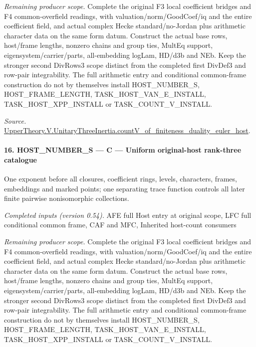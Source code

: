 \emph{Remaining producer scope.} Complete the original F3 local coefficient bridges and F4 common-overfield readings, with valuation/norm/GoodCoef/iq and the entire coefficient field, and actual complex Hecke standard/no-Jordan plus arithmetic character data on the same form datum. Construct the actual base rows, host/frame lengths, nonzero chains and group ties, MultEq support, eigensystem/carrier/parts, all-embedding logLam, HD/d3b and NEb. Keep the stronger second DivRows3 scope distinct from the completed first DivDef3 and row-pair integrability. The full arithmetic entry and conditional common-frame construction do not by themselves install HOST\_\allowbreak NUMBER\_\allowbreak S, HOST\_\allowbreak FRAME\_\allowbreak LENGTH, TASK\_\allowbreak HOST\_\allowbreak VAN\_\allowbreak E\_\allowbreak INSTALL, TASK\_\allowbreak HOST\_\allowbreak XPP\_\allowbreak INSTALL or TASK\_\allowbreak COUNT\_\allowbreak V\_\allowbreak INSTALL.

\emph{Source.} \href{https://github.com/CocoSgt/riemann-hypothesis-lean/blob/7cbf7a0c32fca1badf05931879a37c3f8a2b03b4/src/Development/AutomorphicArithmetic/AutomorphicVarieties/ModularityArgument/ThresholdArguments/DenseThresholdCases/CountVOf.lean#L33-L60}{UpperTheory.V.UnitaryThreeInertia.countV\_\allowbreak of\_\allowbreak finiteness\_\allowbreak duality\_\allowbreak euler\_\allowbreak host}.



\paragraph{16. HOST\_\allowbreak NUMBER\_\allowbreak S — C — Uniform original-host rank-three catalogue}

One exponent before all closures, coefficient rings, levels, characters, frames, embeddings and marked points; one separating trace function controls all later finite pairwise nonisomorphic collections.

\emph{Completed inputs (version 0.54).} AFE full Host entry at original scope, LFC full conditional common frame, CAF and MFC, Inherited host-count consumers

\emph{Remaining producer scope.} Complete the original F3 local coefficient bridges and F4 common-overfield readings, with valuation/norm/GoodCoef/iq and the entire coefficient field, and actual complex Hecke standard/no-Jordan plus arithmetic character data on the same form datum. Construct the actual base rows, host/frame lengths, nonzero chains and group ties, MultEq support, eigensystem/carrier/parts, all-embedding logLam, HD/d3b and NEb. Keep the stronger second DivRows3 scope distinct from the completed first DivDef3 and row-pair integrability. The full arithmetic entry and conditional common-frame construction do not by themselves install HOST\_\allowbreak NUMBER\_\allowbreak S, HOST\_\allowbreak FRAME\_\allowbreak LENGTH, TASK\_\allowbreak HOST\_\allowbreak VAN\_\allowbreak E\_\allowbreak INSTALL, TASK\_\allowbreak HOST\_\allowbreak XPP\_\allowbreak INSTALL or TASK\_\allowbreak COUNT\_\allowbreak V\_\allowbreak INSTALL.

